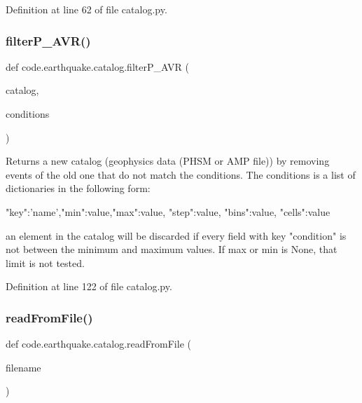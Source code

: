 Definition at line 62 of file catalog.\+py.

\mbox{\label{namespacecode_1_1earthquake_1_1catalog_a5f5f312808f59fead17e8a240c6babe5}} 
\subsubsection{\texorpdfstring{filter\+P\+\_\+\+A\+V\+R()}{filterP\_AVR()}}
{\footnotesize\ttfamily def code.\+earthquake.\+catalog.\+filter\+P\+\_\+\+A\+VR (\begin{DoxyParamCaption}\item[{}]{catalog,  }\item[{}]{conditions }\end{DoxyParamCaption})}

\begin{DoxyVerb}Returns a new catalog (geophysics data (PHSM or AMP file)) by removing events of the old one that do not 
match the conditions. The conditions is a list of dictionaries in 
the following form:

{"key":'name',"min":value,"max":value, "step":value, "bins":value, "cells":value} 

an element in the catalog will be discarded if every field with key "condition" is not 
between the minimum and maximum values. If max or min is None, that limit is not tested.\end{DoxyVerb}
 

Definition at line 122 of file catalog.\+py.

\mbox{\label{namespacecode_1_1earthquake_1_1catalog_a73f93e3c5cd169e910d81499d024f15e}} 
\subsubsection{\texorpdfstring{read\+From\+File()}{readFromFile()}}
{\footnotesize\ttfamily def code.\+earthquake.\+catalog.\+read\+From\+File (\begin{DoxyParamCaption}\item[{}]{filename }\end{DoxyParamCaption})}

